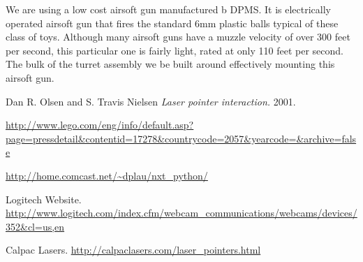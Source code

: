 \documentclass[10pt,twocolumn,letterpaper]{article}
\begin{document}
We are using a low cost airsoft gun manufactured b DPMS. It is electrically operated airsoft gun that fires the standard 6mm plastic balls typical of these class of toys. Although many airsoft guns have a muzzle velocity of over 300 feet per second, this particular one is fairly light, rated at only 110 feet per second. The bulk of the turret assembly we be built around effectively mounting this airsoft gun.



\begin{thebibliography}{1}

   Dan R. Olsen and S. Travis Nielsen {\em Laser pointer interaction.} 2001. 

   \url{http://www.lego.com/eng/info/default.asp?page=pressdetail&contentid=17278&countrycode=2057&yearcode=&archive=false}

   \url{http://home.comcast.net/~dplau/nxt\_python/}
  
	 Logitech Website. \url{http://www.logitech.com/index.cfm/webcam\_communications/webcams/devices/352&cl=us,en}

   Calpac Lasers. \url{http://calpaclasers.com/laser\_pointers.html}


  \end{thebibliography}
\end{document}
